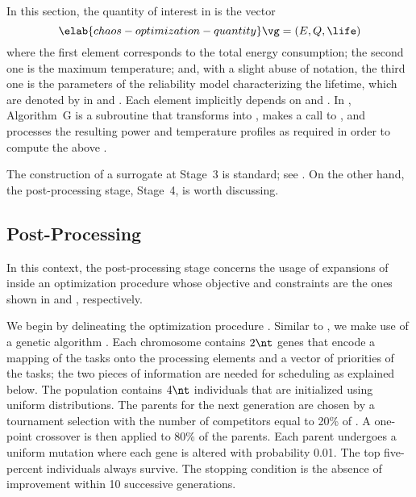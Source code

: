 In this section, the quantity of interest \g in  is the
vector
\begin{equation} \elab{chaos-optimization-quantity}
  \vg = (E, Q, \life)
\end{equation}
where the first element corresponds to the total energy consumption; the second
one is the maximum temperature; and, with a slight abuse of notation, the third
one is the parameters of the reliability model characterizing the lifetime,
which are denoted by \vg in  and
. Each element implicitly depends on \schedule
and \vu. In , Algorithm~G is a subroutine that
transforms \vz into \vu, makes a call to
, and processes the resulting
power and temperature profiles as required in order to compute the above \vg.

The construction of a surrogate at Stage~3 is standard; see
. On the other hand, the post-processing stage,
Stage~4, is worth discussing.

\subsection{Post-Processing}

In this context, the post-processing stage concerns the usage of expansions of
 inside an optimization procedure whose
objective and constraints are the ones shown in
 and ,
respectively.

We begin by delineating the optimization procedure \perse. Similar to
, we make use of a genetic algorithm
\cite{schmitz2004}. Each chromosome contains $2 \nt$ genes that encode a mapping
of the tasks onto the processing elements and a vector of priorities of the
tasks; the two pieces of information are needed for scheduling as explained
below. The population contains $4 \nt$ individuals that are initialized using
uniform distributions. The parents for the next generation are chosen by a
tournament selection with the number of competitors equal to 20\% of \nt. A
one-point crossover is then applied to 80\% of the parents. Each parent
undergoes a uniform mutation where each gene is altered with probability 0.01.
The top five-percent individuals always survive. The stopping condition is the
absence of improvement within 10 successive generations.

